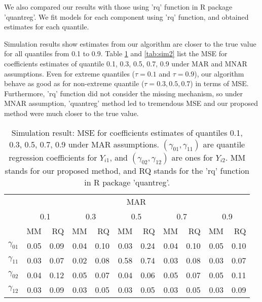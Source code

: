 \documentclass[12pt]{article}
\begin{document}
We also compared our results with those using 'rq' function in R
package 'quantreg'. We fit models for each component using 'rq'
function, and obtained estimates for each quantile.

Simulation results show estimates from our algorithm are closer to the
true value for all quantiles from 0.1 to 0.9. Table \ref{tab:sim} and
\ref{tab:sim2} list the MSE for coefficients estimates of quantile
0.1, 0.3, 0.5, 0.7, 0.9 under MAR and MNAR assumptions. Even for
extreme quantiles ($\tau = 0.1$ and $\tau = 0.9$), our algorithm
behave as good as for non-extreme quantile ($\tau = 0.3, 0.5, 0.7$) in
terms of MSE. Furthermore, 'rq' function did not consider the missing
mechanism, so under MNAR assumption, 'quantreg' method led to
tremendous MSE and our proposed method were much closer to the true
value.

\begin{table}
  \renewcommand{\arraystretch}{1.3}
  \centering
  \caption{Simulation result: MSE for coefficients estimates of quantiles
    0.1, 0.3, 0.5, 0.7, 0.9 under MAR assumptions. $(\gamma_{01}, \gamma_{11})$ 
    are quantile regression coefficients for $Y_{i1}$, and $(\gamma_{02}, \gamma_{12})$ 
    are ones for $Y_{i2}$. MM stands for our proposed method, and RQ stands for the 'rq' 
    function in R package 'quantreg'.}
  \vspace{10pt}
  \begin{tabular}{rrrrrrrrrrr}
    \hline
    & \multicolumn{ 10}{c}{MAR} \\
    \cline{2-11}
    &  \multicolumn{2}{c}{0.1} &  \multicolumn{2}{c}{0.3} &  \multicolumn{2}{c}{0.5} &  \multicolumn{2}{c}{0.7} &  \multicolumn{2}{c}{0.9} \\
    \cline{2-11}
    & MM & RQ    & MM & RQ    & MM & RQ    & MM & RQ    & MM & RQ \\
    \hline
    $\gamma_{01}$ &  0.05 &0.09& 0.04  &0.10 &0.03 &0.24 &0.04 &0.10 &0.05 &0.10 \\
    $\gamma_{11}$ &  0.03 &0.07&  0.02 &0.08 &0.58 &0.74 &0.03 &0.08 &0.03 &0.07 \\ 
    $\gamma_{02}$ & 0.04  &0.12&  0.05 &0.07 &0.04 &0.06 &0.05 &0.07 &0.05 &0.11 \\ 
    $\gamma_{12}$ &  0.03 & 0.09& 0.03 &0.05 &0.03 &0.05 &0.03 &0.05 &0.03 &0.09 \\ 
    \hline
  \end{tabular}  \label{tab:sim}
\end{table}
\end{document}
